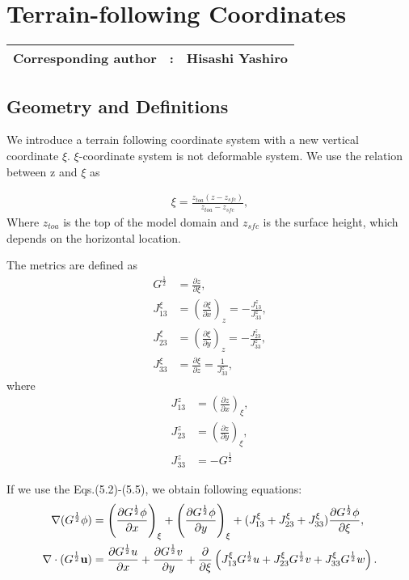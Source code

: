 \chapter{Terrain-following Coordinates}
\label{chap:terrain-following}
{\bf \Large 
\begin{tabular}{ccc}
\hline
  Corresponding author & : & Hisashi Yashiro\\
\hline
\end{tabular}
}

\section{Geometry and Definitions}
We introduce a terrain following coordinate system with a new vertical coordinate $\xi$. 
$\xi$-coordinate system is not deformable system. We use the relation between z and $\xi$ as

\begin{eqnarray}
 \xi = \frac{z_{toa}(z-z_{sfc})}{z_{toa}-z_{sfc}},
\end{eqnarray}
Where $z_{toa}$ is the top of the model domain and $z_{sfc}$ is the surface height, 
which depends on the horizontal location.

The metrics are defined as
\begin{align}
 G^{\frac{1}{2}} &= \frac{\partial z}{\partial \xi}, \\
 J^{\xi}_{13} &= \left(\frac{\partial \xi}{\partial x}\right)_{z} = -\frac{J^{z}_{13}}{J^{z}_{33}},\\
 J^{\xi}_{23} &= \left(\frac{\partial \xi}{\partial y}\right)_{z} = -\frac{J^{z}_{23}}{J^{z}_{33}},\\
 J^{\xi}_{33} &=       \frac{\partial \xi}{\partial z}            =  \frac{1}         {J^{z}_{33}},
\end{align}
where
\begin{align}
 J^{z}_{13} &= \left(\frac{\partial z}{\partial x}\right)_{\xi},\\
 J^{z}_{23} &= \left(\frac{\partial z}{\partial y}\right)_{\xi},\\
 J^{z}_{33} &= -{G^{\frac{1}{2}}}
\end{align}

If we use the Eqs.(5.2)-(5.5), we obtain following equations:
\begin{align}
 \nabla (G^{\frac{1}{2}} \phi) &= \left(\frac{\partial G^{\frac{1}{2}} \phi}{\partial x}\right)_{\xi}
                                      + \left(\frac{\partial G^{\frac{1}{2}} \phi}{\partial y}\right)_{\xi}
                                      + (J^{\xi}_{13}+J^{\xi}_{23}+J^{\xi}_{33}) \frac{\partial G^{\frac{1}{2}} \phi}{\partial \xi}, \\
 \nabla \cdot (G^{\frac{1}{2}} \bf u) &= \frac{\partial G^{\frac{1}{2}} u}{\partial x}
                                       + \frac{\partial G^{\frac{1}{2}} v}{\partial y}
                                       + \frac{\partial}{\partial \xi}
                                         \left(J^{\xi}_{13} {G^{\frac{1}{2}}} u
                                              +J^{\xi}_{23} {G^{\frac{1}{2}}} v
                                              +J^{\xi}_{33} {G^{\frac{1}{2}}} w
                                         \right).
\end{align}

